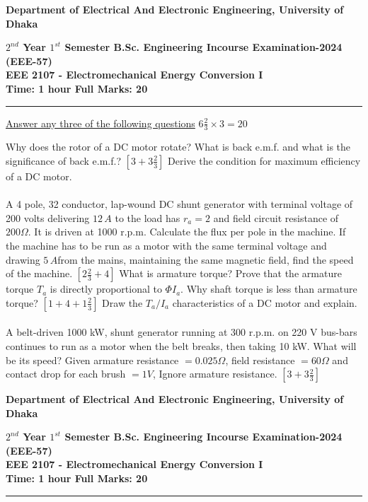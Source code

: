\documentclass[a4paper,11pt]{exam}
\begin{document}
\newpage
\begin{center}
    \begin{large}
        {\textbf{
            Department of Electrical And Electronic Engineering, University of Dhaka \\
        }}
    \end{large}
    \textbf{$2^{nd}$ Year $1^{st}$ Semester B.Sc. Engineering Incourse Examination-2024 (EEE-57) \\
        EEE 2107 - Electromechanical Energy Conversion I \\
        Time: 1 hour \hfill Full Marks: 20}
    \noindent\rule{\linewidth}{1.2pt}
\end{center}
\underline{Answer any three of the following questions} \hfill $6\frac{2}{3} \times 3 = 20$
\begin{questions}
    \question Why does the rotor of a DC motor rotate? What is back e.m.f. and what is the significance of back e.m.f.? \hfill $[3+3\frac{2}{3}]$
    \question Derive the condition for maximum efficiency of a DC motor.  \\ \\ 
    A 4 pole, 32 conductor, lap-wound DC shunt generator with terminal voltage of 200 volts delivering $12 \, A$ to the load has $r_a = 2$ and field circuit resistance of $200\Omega$. It is driven at 1000 r.p.m. Calculate the flux per pole in the machine. If the machine has to be run as a motor with the same terminal voltage and drawing $5 \, A$from the mains, maintaining the same magnetic field, find the speed of the machine. \hfill $[2\frac{2}{3}+4]$
    \question What is armature torque? Prove that the armature torque $T_a$ is directly proportional to $\Phi I_a$. Why shaft torque is less than armature torque? \hfill $[1+4+1\frac{2}{3}]$
    \question Draw the $T_a/I_a$ characteristics of a DC motor and explain. \\ \\
    A belt-driven 1000 kW, shunt generator running at 300 r.p.m. on 220 V bus-bars continues to run as a motor when the belt breaks, then taking 10 kW. What will be its speed? Given armature resistance $= 0.025 \Omega$, field resistance $= 60 \Omega$ and contact drop for each brush $=1V$, Ignore armature resistance. \hfill $[3+3\frac{2}{3}]$ 
\end{questions}
\newpage
\begin{center}
    \begin{large}
        {\textbf{
            Department of Electrical And Electronic Engineering, University of Dhaka \\
        }}
    \end{large}
    \textbf{$2^{nd}$ Year $1^{st}$ Semester B.Sc. Engineering Incourse Examination-2024 (EEE-57) \\
        EEE 2107 - Electromechanical Energy Conversion I \\
        Time: 1 hour \hfill Full Marks: 20}
    \noindent\rule{\linewidth}{1.2pt}
\end{center}
\end{document}
